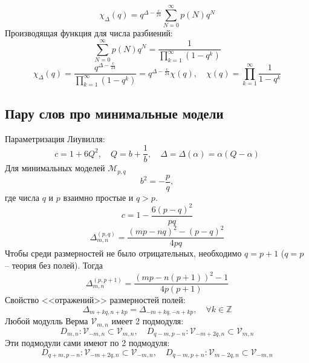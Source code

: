 \documentclass[12pt]{article}
\theoremstyle{definition}
\begin{document}
\begin{equation}
    \chi_\Delta(q)=q^{\Delta-\frac{c}{24}}\sum\limits_{N=0}^\infty p(N)q^N
\end{equation}
Производящая функция для числа разбиений:
\begin{equation}
    \sum\limits_{N=0}^\infty p(N)q^N=\frac{1}{\prod\limits_{k=1}^\infty(1-q^k)}
\end{equation}
\begin{equation}
    \chi_\Delta(q)=\frac{q^{\Delta-\frac{c}{24}}}{\prod\limits_{k=1}^\infty(1-q^k)}=q^{\Delta-\frac{c}{24}}\chi(q),\quad\chi(q)=\prod\limits_{k=1}^\infty\frac{1}{1-q^k}
\end{equation}
\subsection{Пару слов про минимальные модели}
Параметризация Лиувилля:
\begin{equation}
    c=1+6Q^2,\quad Q=b+\frac{1}{b},\quad \Delta=\Delta(\alpha)=\alpha(Q-\alpha)
\end{equation}
Для минимальных моделей $\mathcal{M}_{p,q}$
\begin{equation}
    b^2=-\frac{p}{q},
\end{equation}
где числа $q$ и $p$ взаимно простые и $q>p$.
\begin{equation}
    c=1-\frac{6(p-q)^2}{pq}
\end{equation}
\begin{equation}
    \Delta^{(p,q)}_{m,n}=\frac{(mp-nq)^2-(p-q)^2}{4pq}
\end{equation}
Чтобы среди размерностей не было отрицательных, необходимо $q=p+1$ ($q=p$ -- теория без полей). Тогда
\begin{equation}
    \Delta^{(p,p+1)}_{m,n}=\frac{(mp-n(p+1))^2-1}{4p(p+1)}
\end{equation}
Свойство <<отражений>> размерностей полей:
\begin{equation}
    \Delta_{m+kq,n+kp}=\Delta_{-m+kq,-n+kp},\quad\forall k\in\mathbb{Z}
\end{equation}
Любой модулль Верма $\mathcal{V}_{m,n}$ имеет 2 подмодуля:
\begin{equation}
    D_{m,n}:\mathcal{V}_{-m,n}\subset\mathcal{V}_{m,n} ,\quad D_{q-m,p-n}:\mathcal{V}_{-m+2q,n}\subset\mathcal{V}_{m,n}
\end{equation}
Эти подмодули сами имеют по 2 подмодуля:
\begin{equation}
    D_{q+m,p-n}:\mathcal{V}_{-m+2q,n}\subset\mathcal{V}_{-m,n},\quad D_{q-m,p+n}:\mathcal{V}_{m-2q,n}\subset\mathcal{V}_{-m,n}
\end{equation}
\end{document}
